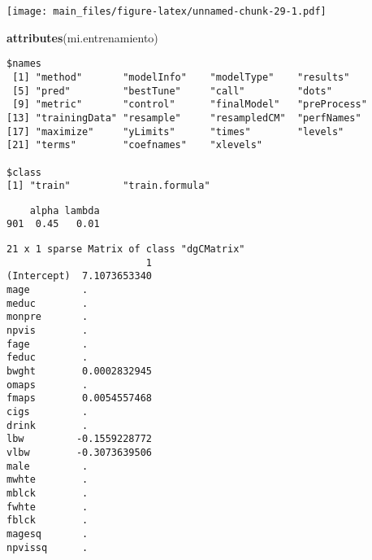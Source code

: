 \documentclass[]{article}
\newenvironment{Shaded}{\begin{snugshade}}{\end{snugshade}}
\newcommand{\KeywordTok}[1]{\textcolor[rgb]{0.13,0.29,0.53}{\textbf{#1}}}
\newcommand{\DataTypeTok}[1]{\textcolor[rgb]{0.13,0.29,0.53}{#1}}
\newcommand{\StringTok}[1]{\textcolor[rgb]{0.31,0.60,0.02}{#1}}
\newcommand{\OperatorTok}[1]{\textcolor[rgb]{0.81,0.36,0.00}{\textbf{#1}}}
\newcommand{\NormalTok}[1]{#1}
\begin{document}
\texttt{[image: main\_files/figure-latex/unnamed-chunk-29-1.pdf]}

\begin{Shaded}
\begin{Highlighting}[]
\KeywordTok{attributes}\NormalTok{(mi.entrenamiento)}
\end{Highlighting}
\end{Shaded}

\begin{verbatim}
$names
 [1] "method"       "modelInfo"    "modelType"    "results"     
 [5] "pred"         "bestTune"     "call"         "dots"        
 [9] "metric"       "control"      "finalModel"   "preProcess"  
[13] "trainingData" "resample"     "resampledCM"  "perfNames"   
[17] "maximize"     "yLimits"      "times"        "levels"      
[21] "terms"        "coefnames"    "xlevels"     

$class
[1] "train"         "train.formula"
\end{verbatim}

\begin{Shaded}
\end{Shaded}

\begin{verbatim}
    alpha lambda
901  0.45   0.01
\end{verbatim}

\begin{Shaded}
\end{Shaded}

\begin{verbatim}
21 x 1 sparse Matrix of class "dgCMatrix"
                        1
(Intercept)  7.1073653340
mage         .           
meduc        .           
monpre       .           
npvis        .           
fage         .           
feduc        .           
bwght        0.0002832945
omaps        .           
fmaps        0.0054557468
cigs         .           
drink        .           
lbw         -0.1559228772
vlbw        -0.3073639506
male         .           
mwhte        .           
mblck        .           
fwhte        .           
fblck        .           
magesq       .           
npvissq      .           
\end{verbatim}
\end{document}
